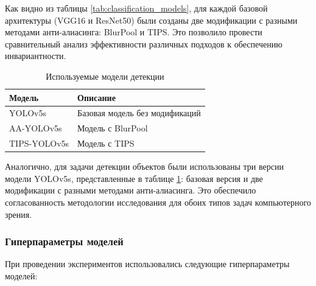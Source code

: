 Как видно из таблицы \ref{tab:classification_models}, для каждой базовой архитектуры (VGG16 и ResNet50) были созданы две модификации с разными методами анти-алиасинга: BlurPool и TIPS. Это позволило провести сравнительный анализ эффективности различных подходов к обеспечению инвариантности.

\begin{table}[ht]
\centering
\caption{Используемые модели детекции}
\label{tab:detection_models}
\begin{tabular}{|l|p{}|}
\hline
\textbf{Модель} & \textbf{Описание} \\ \hline
YOLOv5s & Базовая модель без модификаций \\ \hline
AA-YOLOv5s & Модель с BlurPool \\ \hline
TIPS-YOLOv5s & Модель с TIPS \\ \hline
\end{tabular}
\end{table}

Аналогично, для задачи детекции объектов были использованы три версии модели YOLOv5s, представленные в таблице \ref{tab:detection_models}: базовая версия и две модификации с разными методами анти-алиасинга. Это обеспечило согласованность методологии исследования для обоих типов задач компьютерного зрения.

\subsubsection{Гиперпараметры моделей}
\label{sec:experiments:setup:hyperparams}

При проведении экспериментов использовались следующие гиперпараметры моделей:

